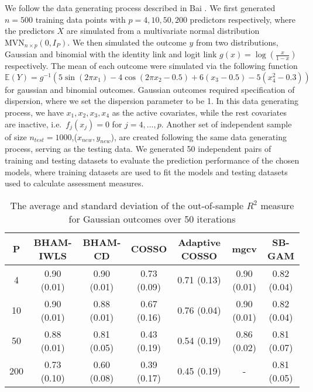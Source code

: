 \documentclass[AMA,STIX1COL,]{WileyNJD-v2}
\begin{document}
We follow the data generating process described in Bai \citep{Bai2021}.
We first generated \(n=500\) training data points with
\(p=4, 10, 50, 200\) predictors respectively, where the predictors \(X\)
are simulated from a multivariate normal distribution
\(\text{MVN}_{n\times p}(0, I_{P})\). We then simulated the outcome
\(y\) from two distributions, Gaussian and binomial with the identity
link and logit link \(g(x) = \log(\frac{x}{1-x})\) respectively. The
mean of each outcome were simulated via the following function \[
\mathbb{E}(Y) = g^{-1}(5 \sin(2\pi x_1) - 4 \cos(2\pi x_2 -0.5) + 6(x_3-0.5) - 5(x_4^2 -0.3))
\] for gaussian and binomial outcomes. Gaussian outcomes required
specification of dispersion, where we set the dispersion parameter to be
1. In this data generating process, we have \(x_1, x_2, x_3, x_4\) as
the active covariates, while the rest covariates are inactive,
i.e.~\(f_j(x_j) = 0\) for \(j = 4, \dots, p\). Another set of
independent sample of size \(n_{test}=1000\),(\(x_{new} ,y_{new}\)), are
created following the same data generating process, serving as the
testing data. We generated 50 independent pairs of training and testing
datasets to evaluate the prediction performance of the chosen models,
where training datasets are used to fit the models and testing datasets
used to calculate assessment measures.

\begin{table}[ht]
\centering
\begin{tabular}{ccccccc}
  \hline
P & BHAM-IWLS & BHAM-CD & COSSO & Adaptive COSSO & mgcv & SB-GAM \\ 
  \hline
  4 & 0.90 (0.01) & 0.90 (0.01) & 0.73 (0.09) & 0.71 (0.13) & 0.90 (0.01) & 0.82 (0.04) \\ 
   10 & 0.90 (0.01) & 0.88 (0.01) & 0.67 (0.16) & 0.76 (0.04) & 0.90 (0.01) & 0.82 (0.04) \\ 
   50 & 0.88 (0.01) & 0.81 (0.05) & 0.43 (0.19) & 0.54 (0.19) & 0.86 (0.02) & 0.81 (0.07) \\ 
  200 & 0.73 (0.10) & 0.60 (0.08) & 0.39 (0.17) & 0.45 (0.19) & - & 0.81 (0.05) \\ 
   \hline
\end{tabular}
\caption{The average and standard deviation of the out-of-sample $R^2$ measure for Gaussian outcomes over 50 iterations} 
\label{tab:gaus}
\end{table}
\end{document}
